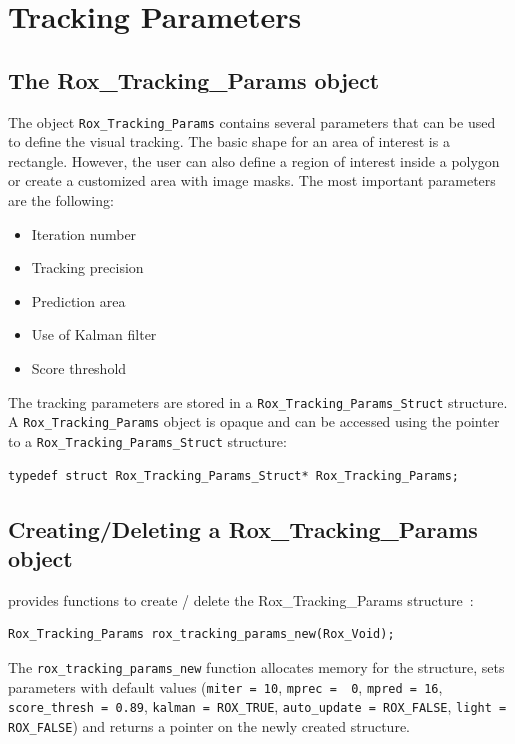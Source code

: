 \section{Tracking Parameters}
\label{sec:tracking_params}

\subsection{The Rox\_Tracking\_Params object}
\label{sse:tracking_params_object}

The object \lstinline$Rox_Tracking_Params$ contains several
parameters that can be used to define the visual tracking.
The basic shape for an area of interest is a rectangle. However,
the user can also define a region of interest inside a polygon or create
a customized area with image masks. The most important parameters are the following:

\begin{itemize}
\item Iteration number
\item Tracking precision
\item Prediction area
\item Use of Kalman filter
\item Score threshold  
\end{itemize}

The tracking parameters are stored in a \lstinline$Rox_Tracking_Params_Struct$ structure. A \lstinline$Rox_Tracking_Params$ object is opaque and can be accessed using the pointer to a \lstinline$Rox_Tracking_Params_Struct$ structure: 
\begin{lstlisting}
typedef struct Rox_Tracking_Params_Struct* Rox_Tracking_Params;
\end{lstlisting}

\subsection{Creating/Deleting a Rox\_Tracking\_Params object}
\label{sse:tracking_params_creating}

\rox{} provides functions to create / delete the Rox\_Tracking\_Params structure~:

\begin{lstlisting}
Rox_Tracking_Params rox_tracking_params_new(Rox_Void);
\end{lstlisting}
The \lstinline$rox_tracking_params_new$ function allocates memory for the structure, 
sets parameters with default values (\lstinline$miter = 10$, \lstinline$mprec =  0$, \lstinline$mpred = 16$, \lstinline$score_thresh = 0.89$, \lstinline$kalman = ROX_TRUE$, \lstinline$auto_update = ROX_FALSE$, \lstinline$light = ROX_FALSE$) and returns a pointer on the newly created structure.\\

